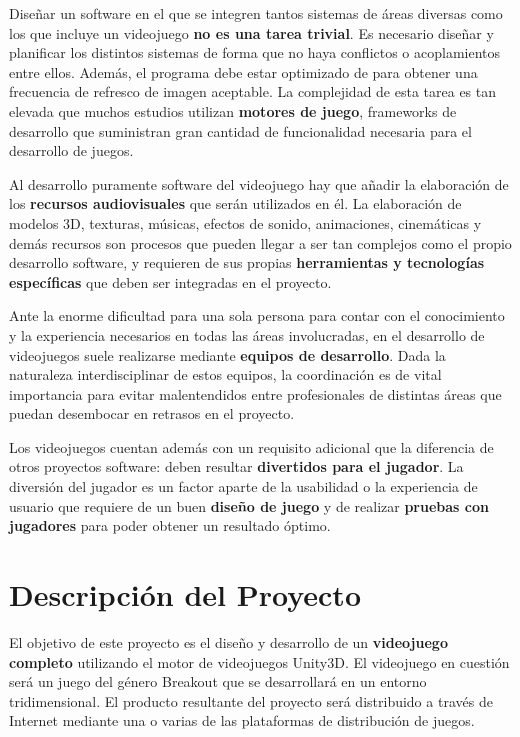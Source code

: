 Diseñar un software en el que se integren tantos sistemas de áreas diversas como los que incluye un videojuego \textbf{no es una tarea trivial}. Es necesario diseñar y planificar los distintos sistemas de forma que no haya conflictos o acoplamientos entre ellos. Además, el programa debe estar optimizado de para obtener una frecuencia de refresco de imagen aceptable. La complejidad de esta tarea es tan elevada que muchos estudios utilizan \textbf{motores de juego}, frameworks de desarrollo que suministran gran cantidad de funcionalidad necesaria para el desarrollo de juegos. 

Al desarrollo puramente software del videojuego hay que añadir la elaboración de los \textbf{recursos audiovisuales} que serán utilizados en él. La elaboración de modelos 3D, texturas, músicas, efectos de sonido, animaciones, cinemáticas y demás recursos son procesos que pueden llegar a ser tan complejos como el propio desarrollo software, y requieren de sus propias \textbf{herramientas y tecnologías específicas} que deben ser integradas en el proyecto. 

Ante la enorme dificultad para una sola persona para contar con el conocimiento y la experiencia necesarios en todas las áreas involucradas, en el desarrollo de videojuegos suele realizarse mediante \textbf{equipos de desarrollo}. Dada la naturaleza interdisciplinar de estos equipos, la coordinación es de vital importancia para evitar malentendidos entre profesionales de distintas áreas que puedan desembocar en retrasos en el proyecto.

Los videojuegos cuentan además con un requisito adicional que la diferencia de otros proyectos software: deben resultar \textbf{divertidos para el jugador}. La diversión del jugador es un factor aparte de la usabilidad o la experiencia de usuario que requiere de un buen \textbf{diseño de juego} y de realizar \textbf{pruebas con jugadores} para poder obtener un resultado óptimo.

\section{Descripción del Proyecto}
El objetivo de este proyecto es el diseño y desarrollo de un \textbf{videojuego completo} utilizando el motor de videojuegos Unity3D. El videojuego en cuestión será un juego del género Breakout que se desarrollará en un entorno tridimensional. El producto resultante del proyecto será distribuido a través de Internet mediante una o varias de las plataformas de distribución de juegos. 

